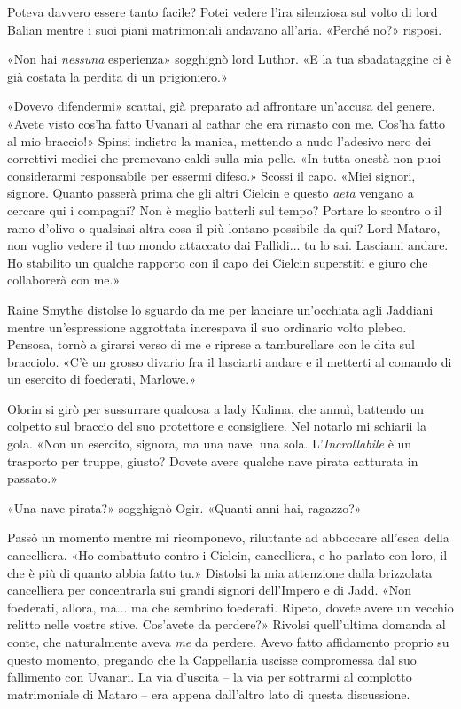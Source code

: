 Poteva davvero essere tanto facile? Potei vedere l'ira silenziosa sul
volto di lord Balian mentre i suoi piani matrimoniali andavano all'aria.
«Perché no?» risposi.

«Non hai \emph{nessuna} esperienza» sogghignò lord Luthor. «E la tua
sbadataggine ci è già costata la perdita di un prigioniero.»

«Dovevo difendermi» scattai, già preparato ad affrontare un'accusa del
genere. «Avete visto cos'ha fatto Uvanari al cathar che era rimasto con
me. Cos'ha fatto al mio braccio!» Spinsi indietro la manica, mettendo a
nudo l'adesivo nero dei correttivi medici che premevano caldi sulla mia
pelle. «In tutta onestà non puoi considerarmi responsabile per essermi
difeso.» Scossi il capo. «Miei signori, signore. Quanto passerà prima
che gli altri Cielcin e questo \emph{aeta} vengano a cercare qui i
compagni? Non è meglio batterli sul tempo? Portare lo scontro o il ramo
d'olivo o qualsiasi altra cosa il più lontano possibile da qui? Lord
Mataro, non voglio vedere il tuo mondo attaccato dai Pallidi... tu lo
sai. Lasciami andare. Ho stabilito un qualche rapporto con il capo dei
Cielcin superstiti e giuro che collaborerà con me.»

Raine Smythe distolse lo sguardo da me per lanciare un'occhiata agli
Jaddiani mentre un'espressione aggrottata increspava il suo ordinario
volto plebeo. Pensosa, tornò a girarsi verso di me e riprese a
tamburellare con le dita sul bracciolo. «C'è un grosso divario fra il
lasciarti andare e il metterti al comando di un esercito di foederati,
Marlowe.»

Olorin si girò per sussurrare qualcosa a lady Kalima, che annuì,
battendo un colpetto sul braccio del suo protettore e consigliere. Nel
notarlo mi schiarii la gola. «Non un esercito, signora, ma una nave, una
sola. L'\emph{Incrollabile} è un trasporto per truppe, giusto? Dovete
avere qualche nave pirata catturata in passato.»

«Una nave pirata?» sogghignò Ogir. «Quanti anni hai, ragazzo?»

Passò un momento mentre mi ricomponevo, riluttante ad abboccare all'esca
della cancelliera. «Ho combattuto contro i Cielcin, cancelliera, e ho
parlato con loro, il che è più di quanto abbia fatto tu.» Distolsi la
mia attenzione dalla brizzolata cancelliera per concentrarla sui grandi
signori dell'Impero e di Jadd. «Non foederati, allora, ma... ma che
sembrino foederati. Ripeto, dovete avere un vecchio relitto nelle vostre
stive. Cos'avete da perdere?» Rivolsi quell'ultima domanda al conte, che
naturalmente aveva \emph{me} da perdere. Avevo fatto affidamento proprio
su questo momento, pregando che la Cappellania uscisse compromessa dal
suo fallimento con Uvanari. La via d'uscita -- la via per sottrarmi al
complotto matrimoniale di Mataro -- era appena dall'altro lato di questa
discussione.

